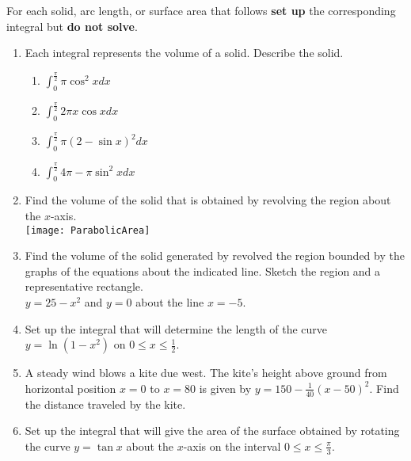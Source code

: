 \documentclass[12 pt]{article}
\begin{document}
For each solid, arc length, or surface area that follows \textbf{set up} the corresponding integral but \textbf{do not solve}. 

\begin{enumerate}

\item Each integral represents the volume of a solid. Describe the solid. 
\begin{enumerate}
	\item $\displaystyle{ \int_{0}^{\frac{\pi}{2}} \pi  \cos^{2} x dx}$
	\item $\displaystyle{ \int_{0}^{\frac{\pi}{2}} 2 \pi x \cos x dx}$
	\item $\displaystyle{ \int_{0}^{\frac{\pi}{2}} \pi (2-\sin x)^2 dx}$
	\item $\displaystyle{ \int_{0}^{\frac{\pi}{2}} 4\pi - \pi \sin^2 x dx}$
\end{enumerate}

\item Find the volume of the solid that is obtained by revolving the region about the $x$-axis. 
\\
\texttt{[image: ParabolicArea]}


\item Find the volume of the solid generated by revolved the region bounded by the graphs of the equations about the indicated line. Sketch the region and a representative rectangle. 
\\
$y=25-x^{2}$ and $y=0$ about the line $x=-5$. 

\newpage

\item Set up the integral that will determine the length of the curve $y=\ln \left( 1-x^2 \right) $ on $0 \leq x \leq \frac{1}{2}$.

\item A steady wind blows a kite due west. The kite's height above ground from horizontal position $x=0$ to $x=80$ is given by $y=150-\frac{1}{40}(x-50)^2$. Find the distance traveled by the kite. 

\item Set up the integral that will give the area of the surface obtained by rotating the curve $y=\tan x$ about the $x$-axis on the interval $ 0 \leq x \leq \frac{\pi}{3} $. 


\end{enumerate}
\end{document}
